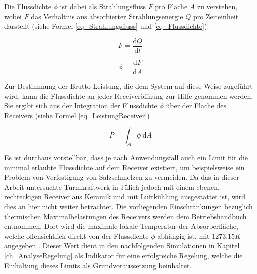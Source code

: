 Die Flussdichte $\phi$ ist dabei als Strahlungsfluss $F$ pro Fläche $A$ zu verstehen, wobei $F$ das Verhältnis aus absorbierter Strahlungsenergie $Q$ pro Zeiteinheit darstellt (siehe Formel \ref{eq_Strahlungsfluss} und \ref{eq_Flussdichte}).

\begin{equation} \label{eq_Strahlungsfluss}
    F = \frac{\text{d}Q}{\text{d} t}
\end{equation}

\begin{equation} \label{eq_Flussdichte}
    \phi = \frac{\text{d}F}{\text{d} A}
\end{equation}

Zur Bestimmung der Brutto-Leistung, die dem System auf diese Weise zugeführt wird, kann die Flussdichte an jeder Receiveröffnung zur Hilfe genommen werden.
Sie ergibt sich aus der Integration der Flussdichte $\phi$ über der Fläche des Receivers (siehe Formel \ref{eq_LeistungReceiver})

\begin{equation} \label{eq_LeistungReceiver}
    P = \int_{A}\phi~\text{d} A
\end{equation}

Es ist durchaus vorstellbar, dass je nach Anwendungsfall auch ein Limit für die minimal erlaubte Flussdichte auf dem Receiver existiert, um beispielsweise ein Problem von Verfestigung von Salzschmelzen zu vermeiden.
Da das in dieser Arbeit untersuchte Turmkraftwerk in Jülich jedoch mit einem ebenen, rechteckigen Receiver aus Keramik und mit Luftkühlung ausgestattet ist, wird dies an hier nicht weiter betrachtet.
Die vorliegenden Einschränkungen bezüglich thermischen Maximalbelastungen des Receivers werden dem Betriebshandbuch entnommen.
Dort wird die maximale lokale Temperatur der Absorberfläche, welche offensichtlich direkt von der Flussdichte $\phi$ abhängig ist, mit $1273.15K$ angegeben \cite{HandbuchJülich}. Dieser Wert dient in den nachfolgenden Simulationen in Kapitel \ref{ch_AnalyseRegelung} als Indikator für eine erfolgreiche Regelung, welche die Einhaltung dieses Limits als Grundvoraussetzung beinhaltet.

